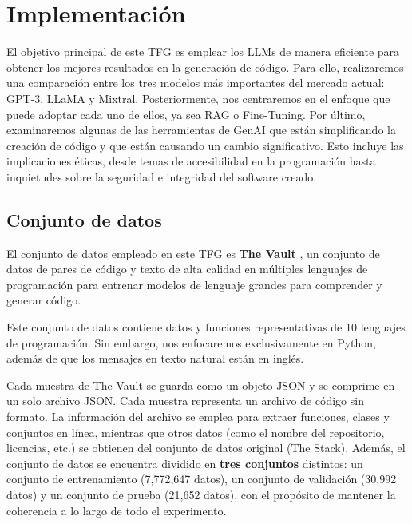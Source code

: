 \chapter{Implementación}
\label{chap:desarrollo}

\lettrine{E}{}l objetivo principal de este \acrfull{TFG} es emplear los \acrfull{LLMs} de manera eficiente para obtener los mejores resultados en la generación de código. Para ello, realizaremos una comparación entre los tres modelos más importantes del mercado actual: \acrshort{GPT}-3, \acrshort{LLaMA} y Mixtral. Posteriormente, nos centraremos en el enfoque que puede adoptar cada uno de ellos, ya sea \acrshort{RAG} o Fine-Tuning. Por último, examinaremos algunas de las herramientas de \acrlong{GenAI} que están simplificando la creación de código y que están causando un cambio significativo. Esto incluye las implicaciones éticas, desde temas de accesibilidad en la programación hasta inquietudes sobre la seguridad e integridad del software creado.

\section{Conjunto de datos}
El conjunto de datos empleado en este \acrshort{TFG} es \textbf{The Vault} \cite{TheVault}, un conjunto de datos de pares de código y texto de alta calidad en múltiples lenguajes de programación para entrenar modelos de lenguaje grandes para comprender y generar código. 
\\
\par Este conjunto de datos contiene datos y funciones representativas de 10 lenguajes de programación. Sin embargo, nos enfocaremos exclusivamente en Python, además de que los mensajes en texto natural están en inglés.
\\
\par Cada muestra de The Vault se guarda como un objeto \acrshort{JSON} y se comprime en un solo archivo \acrshort{JSON}. Cada muestra representa un archivo de código sin formato. La información del archivo se emplea para extraer funciones, clases y conjuntos en línea, mientras que otros datos (como el nombre del repositorio, licencias, etc.) se obtienen del conjunto de datos original (The Stack). Además, el conjunto de datos se encuentra dividido en \textbf{tres conjuntos }distintos: un conjunto de entrenamiento (7,772,647 datos), un conjunto de validación (30,992 datos) y un conjunto de prueba (21,652 datos), con el propósito de mantener la coherencia a lo largo de todo el experimento.

